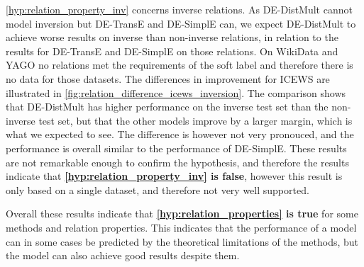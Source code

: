 \autoref{hyp:relation_property_inv} concerns inverse relations. As DE-DistMult cannot model inversion but DE-TransE and DE-SimplE can, we expect DE-DistMult to achieve worse results on inverse than non-inverse relations, in relation to the results for DE-TransE and DE-SimplE on those relations.
On WikiData and YAGO no relations met the requirements of the soft label and therefore there is no data for those datasets. 
The differences in improvement for ICEWS are illustrated in \autoref{fig:relation_difference_icews_inversion}. 
The comparison shows that DE-DistMult has higher performance on the inverse test set than the non-inverse test set, 
but that the other models improve by a larger margin, which is what we expected to see.
The difference is however not very pronouced, and the performance is overall similar to the performance of DE-SimplE. These results are not remarkable enough to confirm the hypothesis, and therefore the results indicate that \textbf{\autoref{hyp:relation_property_inv} is false}, however this result is only based on a single dataset, and therefore not very well supported.

Overall these results indicate that \textbf{\autoref{hyp:relation_properties} is true} for some methods and relation properties. This indicates that the performance of a model can in some cases be predicted by the theoretical limitations of the methods, but the model can also achieve good results despite them.
